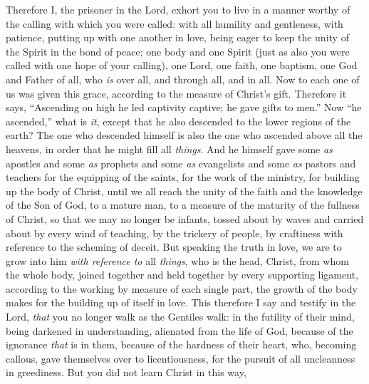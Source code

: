 \begin{biblechapter} %
 Therefore I, the prisoner in the Lord, exhort you to live in a manner worthy of the calling with which you were called:
\verse with all humility and gentleness, with patience, putting up with one another in love,
\verse being eager to keep the unity of the Spirit in the bond of peace;
\verse one body and one Spirit (just as also you were called with one hope of your calling),
\verse one Lord, one faith, one baptism,
\verse one God and Father of all, who \textit{is} over all, and through all, and in all.
 Now to each one of us was given this grace, according to the measure of Christ’s gift.
\verse Therefore it says, “Ascending on high he led captivity captive; 
he gave gifts to men.”
\verse Now “he ascended,” what is \textit{it}, except that he also descended to the lower regions of the earth?
\verse The one who descended himself is also the one who ascended above all the heavens, in order that he might fill all \textit{things}.
\verse And he himself gave some \textit{as} apostles and some \textit{as} prophets and some \textit{as} evangelists and some \textit{as} pastors and teachers
\verse for the equipping of the saints, for the work of the ministry, for building up the body of Christ,
\verse until we all reach the unity of the faith and the knowledge of the Son of God, to a mature man, to a measure of the maturity of the fullness of Christ,
\verse so that we may no longer be infants, tossed about by waves and carried about by every wind of teaching, by the trickery of people, by craftiness with reference to the scheming of deceit.
\verse But speaking the truth in love, we are to grow into him \textit{with reference to} all \textit{things}, who is the head, Christ,
\verse from whom the whole body, joined together and held together by every supporting ligament, according to the working by measure of each single part, the growth of the body makes for the building up of itself in love.
 This therefore I say and testify in the Lord, \textit{that} you no longer walk as the Gentiles walk: in the futility of their mind,
\verse being darkened in understanding, alienated from the life of God, because of the ignorance \textit{that} is in them, because of the hardness of their heart,
\verse who, becoming callous, gave themselves over to licentiousness, for the pursuit of all uncleanness in greediness.
\verse But you did not learn Christ in this way,

\end{biblechapter}

